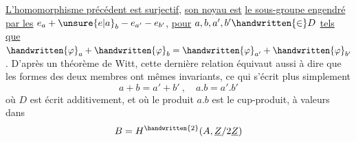 \uline{L'homomorphisme précédent est surjectif}, \uline{son noyau est}  \uline{le sous-groupe engendré par les} $e_a+\unsure{e|a}_b-e_{a'}-e_{b'}$, \uline{pour} $a,b,a',b'\handwritten{\in}D$ \uline{tels que} $\handwritten{\varphi}_a+\handwritten{\varphi}_b=\handwritten{\varphi}_{a'}+\handwritten{\varphi}_{b'}$. D'après un théorème de Witt, cette dernière relation équivaut aussi à dire que les formes des deux membres ont mêmes invariants, ce qui s'écrit plus simplement
\reversemarginpar
{}
\normalmarginpar
\[
a+b=a'+b'\ ,\quad a.b=a'.b'
\]
où $D$ est écrit additivement, et où le produit $a.b$ est le cup-produit, à valeurs dans
\[
B=H^{\handwritten{2}}(A,\underline{Z}/2\underline{Z})
\]
